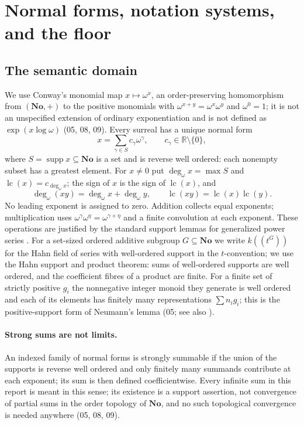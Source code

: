 \documentclass[11pt,oneside]{article}
\numberwithin{equation}{section}
\theoremstyle{definition}
\theoremstyle{remark}
\newcommand{\No}{\mathbf{No}}
\newcommand{\R}{\mathbb R}
\newcommand{\supp}{\operatorname{supp}}
\newcommand{\lc}{\operatorname{lc}}
\newcommand{\ddeg}{\operatorname{deg}_{\omega}}
\begin{document}
\section{Normal forms, notation systems, and the floor}\label{onot:sec:normal}

\subsection{The semantic domain}

We use Conway's monomial map $x\mapsto\omega^x$, an order-preserving
homomorphism from $(\No,+)$ to the positive monomials with
$\omega^{x+y}=\omega^x\omega^y$ and $\omega^0=1$; it is not an unspecified
extension of ordinary exponentiation and is not defined as $\exp(x\log\omega)$
(05, 08, 09). Every surreal has a unique normal form
\begin{equation}\label{onot:eq:normal}
 x=\sum_{\gamma\in S}c_\gamma\omega^\gamma,
 \qquad c_\gamma\in\R\setminus\{0\},
\end{equation}
where $S=\supp x\subseteq\No$ is a set and is reverse well ordered: each
nonempty subset has a greatest element. For $x\ne0$ put $\ddeg x=\max S$ and
$\lc(x)=c_{\ddeg x}$; the sign of $x$ is the sign of $\lc(x)$, and
\begin{equation}\label{onot:eq:leading}
 \ddeg(xy)=\ddeg x+\ddeg y,\qquad \lc(xy)=\lc(x)\lc(y).
\end{equation}
No leading exponent is assigned to zero. Addition collects equal exponents;
multiplication uses $\omega^\gamma\omega^\eta=\omega^{\gamma+\eta}$ and a finite
convolution at each exponent. These operations are justified by the standard
support lemmas for generalized power series \cite{Conway,Gonshor,LM}. For a
set-sized ordered additive subgroup $G\subseteq\No$ we write $k((t^G))$ for the
Hahn field of series with well-ordered support in the $t$-convention; we use the
Hahn support and product theorem: sums of well-ordered supports are well
ordered, and the coefficient fibres of a product are finite. For a finite set of
strictly positive $g_i$ the nonnegative integer monoid they generate is well
ordered and each of its elements has finitely many representations
$\sum n_ig_i$; this is the positive-support form of Neumann's lemma (05; see
also \cite[Proposition~3.7]{Camacho}).

\paragraph{Strong sums are not limits.} An indexed family of normal forms is
strongly summable if the union of the supports is reverse well ordered and only
finitely many summands contribute at each exponent; its sum is then defined
coefficientwise. Every infinite sum in this report is meant in this sense; its
existence is a support assertion, not convergence of partial sums in the order
topology of $\No$, and no such topological convergence is needed anywhere
(05, 08, 09).
\end{document}
